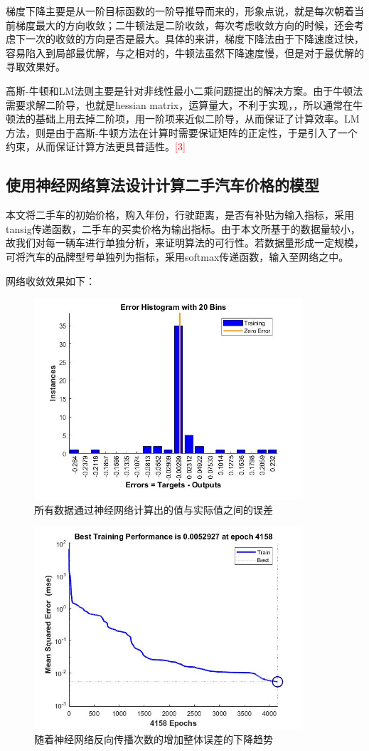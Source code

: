 \documentclass{ctexart}
\newcounter{sub}
\begin{document}
梯度下降主要是从一阶目标函数的一阶导推导而来的，形象点说，就是每次朝着当前梯度最大的方向收敛；二牛顿法是二阶收敛，每次考虑收敛方向的时候，还会考虑下一次的收敛的方向是否是最大。具体的来讲，梯度下降法由于下降速度过快，容易陷入到局部最优解，与之相对的，牛顿法虽然下降速度慢，但是对于最优解的寻取效果好。

高斯-牛顿和LM法则主要是针对非线性最小二乘问题提出的解决方案。由于牛顿法需要求解二阶导，也就是hessian matrix，运算量大，不利于实现，，所以通常在牛顿法的基础上用去掉二阶项，用一阶项来近似二阶导，从而保证了计算效率。LM方法，则是由于高斯-牛顿方法在计算时需要保证矩阵的正定性，于是引入了一个约束，从而保证计算方法更具普适性。\textcolor{red}{[3]}

\subsection{使用神经网络算法设计计算二手汽车价格的模型}
本文将二手车的初始价格，购入年份，行驶距离，是否有补贴为输入指标，采用tansig传递函数，二手车的买卖价格为输出指标。由于本文所基于的数据量较小，故我们对每一辆车进行单独分析，来证明算法的可行性。若数据量形成一定规模，可将汽车的品牌型号单独列为指标，采用softmax传递函数，输入至网络之中。 %

网络收敛效果如下：
\renewcommand\figurename{图}
\begin{figure}[H]
	\centering
	\includegraphics[width=10cm]{a.jpg}
	\caption{所有数据通过神经网络计算出的值与实际值之间的误差} \label{all}
\end{figure}

\renewcommand\figurename{图}
\begin{figure}[H]
	\centering
	\includegraphics[width=10cm]{b.jpg}
	\caption{随着神经网络反向传播次数的增加整体误差的下降趋势} \label{all}
\end{figure}
\end{document}
